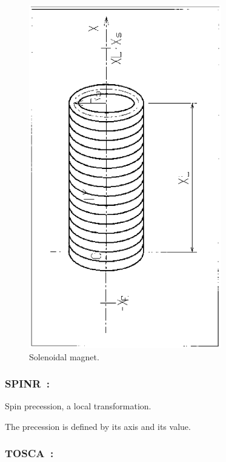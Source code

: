 \vfill

\begin{figure}[H]
\centerline{\includegraphics[height=15cm,angle=-90]{Fig30.ps}}
\caption{\label{fig30} Solenoidal magnet.}
\end{figure}
\vfill




\newpage

\subsubsection*{SPINR~: \SPINRTitl\  } \label{SPINR}  
\medskip

Spin precession, a local transformation.  

\bigskip

\noindent The precession is defined by its axis and its value. 


\newpage

\subsubsection*{TOSCA~: \TOSCATitl} \label{TOSCA} 
\medskip

